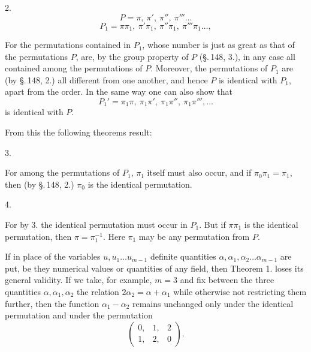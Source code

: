 2. 
\[
P = \pi,\ \pi',\ \pi'',\ \pi''' \ldots
\]
\[
P_1 = \pi\pi_1,\ \pi'\pi_1,\ \pi''\pi_1,\ \pi'''\pi_1 \ldots,
\]

For the permutations contained in $P_1$, whose number is just as great as that of the permutations $P$, are, by the group property of $P$ (\S.\,148, 3.), in any case all contained among the permutations of $P$. Moreover, the permutations of $P_1$ are (by \S.\,148, 2.) all different from one another, and hence $P$ is identical with $P_1$, apart from the order. In the same way one can also show that
\[
P_1' = \pi_1\pi,\ \pi_1\pi',\ \pi_1\pi'',\ \pi_1\pi''', \ldots
\]
is identical with $P$.

From this the following theorems result:

3. 

For among the permutations of $P_1$, $\pi_1$ itself must also occur, and if $\pi_0\pi_1 = \pi_1$, then (by \S.\,148, 2.) $\pi_0$ is the identical permutation.

4. 

For by 3. the identical permutation must occur in $P_1$. But if $\pi\pi_1$ is the identical permutation, then $\pi = \pi_1^{-1}$. Here $\pi_1$ may be any permutation from $P$.

If in place of the variables $u, u_1 \ldots u_{m-1}$ definite quantities $\alpha, \alpha_1, \alpha_2 \ldots \alpha_{m-1}$ are put, be they numerical values or quantities of any field, then Theorem 1. loses its general validity. If we take, for example, $m = 3$ and fix between the three quantities $\alpha, \alpha_1, \alpha_2$ the relation $2\alpha_2 = \alpha + \alpha_1$
while otherwise not restricting them further, then the function $\alpha_1 - \alpha_2$ remains unchanged only under the identical permutation and under the permutation
\[
\begin{pmatrix} 0, & 1, & 2 \\ 1, & 2, & 0 \end{pmatrix}.
\]
